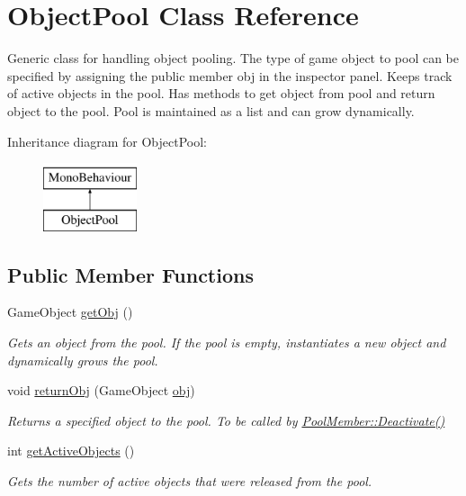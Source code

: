\hypertarget{class_object_pool}{}\section{Object\+Pool Class Reference}
\label{class_object_pool}


Generic class for handling object pooling. The type of game object to pool can be specified by assigning the public member obj in the inspector panel. Keeps track of active objects in the pool. Has methods to get object from pool and return object to the pool. Pool is maintained as a list and can grow dynamically.  


Inheritance diagram for Object\+Pool\+:\begin{figure}[H]
\begin{center}
\leavevmode
\includegraphics[height=2.000000cm]{class_object_pool}
\end{center}
\end{figure}
\subsection*{Public Member Functions}
\begin{DoxyCompactItemize}
\item 
Game\+Object \hyperlink{class_object_pool_a1a2f42245b2acfef316e203e6a88c7f2}{get\+Obj} ()
\begin{DoxyCompactList}\small\item\em Gets an object from the pool. If the pool is empty, instantiates a new object and dynamically grows the pool. \end{DoxyCompactList}\item 
void \hyperlink{class_object_pool_a61d15dbf443949f7a0b59031c6a8d2e4}{return\+Obj} (Game\+Object \hyperlink{class_object_pool_ab54421fb72fa4934d9cde669fe703919}{obj})
\begin{DoxyCompactList}\small\item\em Returns a specified object to the pool. To be called by \hyperlink{class_pool_member_a6f883eaed133e4b288a3847aea3ff33a}{Pool\+Member\+::\+Deactivate()} \end{DoxyCompactList}\item 
int \hyperlink{class_object_pool_acfba780835d2ecfdae26e28e4f564382}{get\+Active\+Objects} ()
\begin{DoxyCompactList}\small\item\em Gets the number of active objects that were released from the pool. \end{DoxyCompactList}\end{DoxyCompactItemize}
